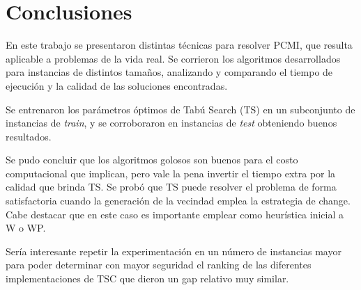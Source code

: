 \section{Conclusiones}

En este trabajo se presentaron distintas técnicas para resolver PCMI, que resulta aplicable a problemas de la vida real. Se corrieron los algoritmos desarrollados para instancias de distintos tamaños, analizando y comparando el tiempo de ejecución y la calidad de las soluciones encontradas.

Se entrenaron los parámetros óptimos de Tabú Search (TS) en un subconjunto de instancias de \textit{train}, y se corroboraron en instancias de \textit{test} obteniendo buenos resultados.

Se pudo concluir que los algoritmos golosos son buenos para el costo computacional que implican, pero vale la pena invertir el tiempo extra por la calidad que brinda TS. Se probó que TS puede resolver el problema de forma satisfactoria cuando la generación de la vecindad emplea la estrategia de change. Cabe destacar que en este caso es importante emplear como heurística inicial a W o WP.

Sería interesante repetir la experimentación en un número de instancias mayor para poder determinar con mayor seguridad el ranking de las diferentes implementaciones de TSC que dieron un gap relativo muy similar.